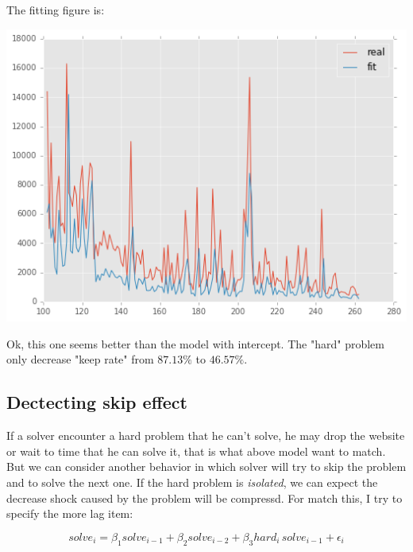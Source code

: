 \documentclass{article}
\begin{document}
The fitting figure is:

\includegraphics[scale=0.55]{tail2.png}

Ok, this one seems better than the model with intercept. The "hard" problem only decrease "keep rate" 
from $87.13\%$ to $46.57\%$.

\subsection{Dectecting skip effect}

If a solver encounter a hard problem that he can't solve, he may drop the website or wait to time that he can
solve it, that is what above model want to match. But we can consider another behavior in which solver will
try to skip the problem and to solve the next one. If the hard problem is \textit{isolated}, we can expect
the decrease shock caused by the problem will be compressd. For match this, I try to specify the more lag item:

\[
solve_i = \beta_1 solve_{i-1} + \beta_2 solve_{i-2} + \beta_3 hard_i \, solve_{i-1} + \epsilon_i
\]
\end{document}
